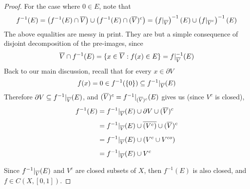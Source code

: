 \documentclass[../../main.tex]{subfiles}
\begin{document}
\begin{proof}
    For the case where $0\in E$, note that 
    \[
    f^{-1}(E) = \left(f^{-1}(E)\cap \overline{V}\right)\cup\left(f^{-1}(E)\cap(\overline{V})^c\right)=\left(f|_{\overline{V}}\right)^{-1}(E)\cup \left(f|_{\overline{V}^c}\right)^{-1}(E)
    \]
    The above equalities are messy in print. They are but a simple consequence of disjoint decomposition of the pre-images, since
    \[
    \overline{V}\cap f^{-1}(E) = \{x\in \overline{V}:f(x)\in E\} = f|_{\overline{V}}^{-1}(E)
    \]
    Back to our main discussion, recall that for every $x\in\partial V$
    \[
    f(x)=0\in f^{-1}(\{0\})\subseteq f^{-1}|_{\overline{V}}(E)
    \]
    Therefore $\partial V\subseteq f^{-1}|_{\overline{V}}(E)$, and $(\overline{V})^c = f^{-1}|_{(\overline{V})^c}(E)$ gives us (since $V^c$ is closed),
    \begin{align*}
        f^{-1}(E) &=f^{-1}|_{\overline{V}}(E)\cup \partial V\cup (\overline{V})^c \\[1ex]
        &= f^{-1}|_{\overline{V}}(E)\cup \overline{(V^c)}\cup (\overline{V})^c \\[1ex]
        &= f^{-1}|_{\overline{V}}(E)\cup \left(V^c\cup V^{co}\right) \\[1ex]
        &= f^{-1}|_{\overline{V}}(E)\cup V^c \\[1ex]
    \end{align*}
    Since $f^{-1}|_{\overline{V}}(E)$ and $V^c$ are closed subsets of $X$, then $f^{-1}(E)$ is also closed, and $f\in C(X,[0,1])$.
\end{proof}
\end{document}
